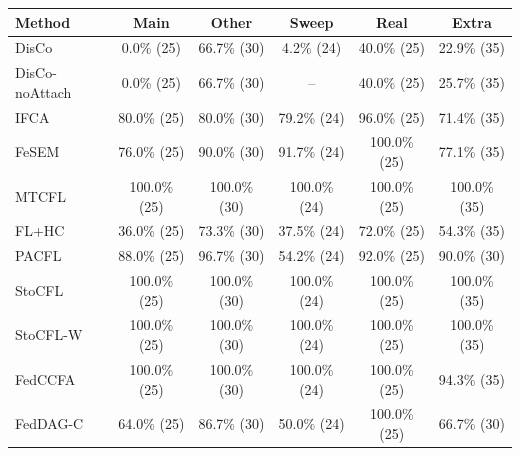{\scriptsize
\begin{tabular}{l c c c c c}
\toprule
Method & Main & Other & Sweep & Real & Extra \\
\midrule
DisCo & 0.0\% (25) & 66.7\% (30) & 4.2\% (24) & 40.0\% (25) & 22.9\% (35) \\
DisCo-noAttach & 0.0\% (25) & 66.7\% (30) & -- & 40.0\% (25) & 25.7\% (35) \\
IFCA & 80.0\% (25) & 80.0\% (30) & 79.2\% (24) & 96.0\% (25) & 71.4\% (35) \\
FeSEM & 76.0\% (25) & 90.0\% (30) & 91.7\% (24) & 100.0\% (25) & 77.1\% (35) \\
MTCFL & 100.0\% (25) & 100.0\% (30) & 100.0\% (24) & 100.0\% (25) & 100.0\% (35) \\
FL+HC & 36.0\% (25) & 73.3\% (30) & 37.5\% (24) & 72.0\% (25) & 54.3\% (35) \\
PACFL & 88.0\% (25) & 96.7\% (30) & 54.2\% (24) & 92.0\% (25) & 90.0\% (30) \\
StoCFL & 100.0\% (25) & 100.0\% (30) & 100.0\% (24) & 100.0\% (25) & 100.0\% (35) \\
StoCFL-W & 100.0\% (25) & 100.0\% (30) & 100.0\% (24) & 100.0\% (25) & 100.0\% (35) \\
FedCCFA & 100.0\% (25) & 100.0\% (30) & 100.0\% (24) & 100.0\% (25) & 94.3\% (35) \\
FedDAG-C & 64.0\% (25) & 86.7\% (30) & 50.0\% (24) & 100.0\% (25) & 66.7\% (30) \\
\bottomrule
\end{tabular}
}

